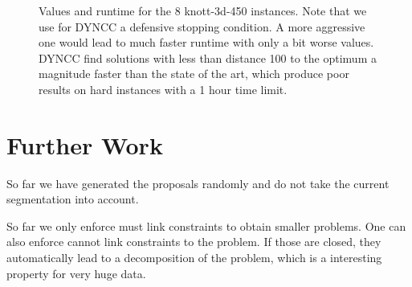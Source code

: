 \documentclass[10pt,twocolumn,letterpaper]{article}
\begin{document}
%






\begin{figure}

\caption{Values and runtime for the 8 knott-3d-450 instances. Note that we use for DYNCC a defensive stopping condition.
A more aggressive one would lead to much faster runtime with only a bit worse values.
DYNCC find solutions with less than distance 100 to the optimum a magnitude faster than the state of the art, which produce poor results on hard instances with a 1 hour time limit.
}
\end{figure}



%


\section{Further Work}\label{sec:future}
So far we have generated the proposals randomly and do not take the current segmentation into account.

So far we only enforce must link constraints to obtain smaller problems.
One can also enforce cannot link constraints to the problem. 
If those are closed, they automatically lead to a decomposition of the problem, 
which is a interesting property for very huge data.
\end{document}
